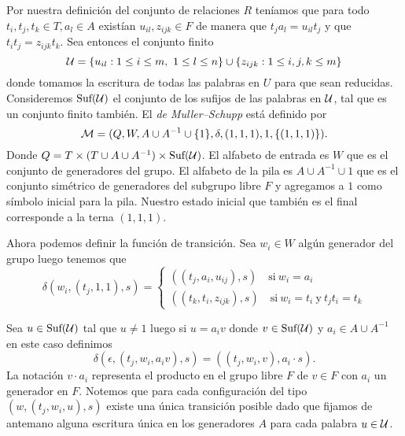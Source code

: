 \documentclass[tesis.tex]{subfiles}
\begin{document}
	Por nuestra definición del conjunto de relaciones $R$ teníamos que para todo $t_{i}, t_{j}, t_{k} \in T, a_{l} \in A$ existían $u_{il}, z_{ijk} \in F$ de manera que 
	$t_j a_l = u_{il} t_j $ y que $ t_it_j = z_{ijk}t_k $. 
	Sea entonces el conjunto finito 
	\[
	{\cal U} =  \{u_{il} : 1 \le i \le m, \ 1 \le l \le n \}  \cup  \{z_{ijk} : 1 \le i,j,k \le m\} 
	\]
	donde tomamos la escritura de todas las palabras en $U$ para que sean reducidas.
	Consideremos 
	$\text{Suf}({\cal U})$
	el conjunto de los sufijos de las palabras en $\cal U$, tal que es un conjunto finito también.
	El \emph{\APD de Muller--Schupp } está definido por 
	\[
	{\cal M }= (Q, W , A \cup A^{-1} \cup \{ 1 \}, \delta, (1,1,1), 1 ,\{(1,1,1)\}).
	\]
	Donde $Q = T \times (T \cup A \cup A^{-1}) \times \text{Suf}(\cal U)$.
	El alfabeto de entrada es $W$ que es el conjunto de generadores del grupo.
	El alfabeto de la pila es $A \cup A^{-1} \cup 1$ que es el conjunto simétrico de generadores del subgrupo libre $F$ y agregamos a $1$ como símbolo inicial para la pila.
	Nuestro estado inicial que también es el final corresponde a la terna $(1,1,1)$.

	Ahora podemos definir la función de transición. 
	Sea $w_i \in W$ algún generador del grupo luego tenemos que
	\[
	\delta(w_i,(t_j,1,1), s) =
	\begin{cases}
		((t_j,a_i,u_{ij}), s) \quad \text{si} \ w_{i}=a_{i} \\
		((t_k,t_i,z_{ijk}), s) \quad \text{si} \ w_{i}=t_{i} \ \text{y} \ t_{j}t_{i} = t_{k}
	\end{cases}\]

	Sea $u \in \text{Suf}({\cal U})$ tal que $u \neq 1$ luego si $u = a_{i}v $ donde $v \in \text{Suf}(\cal U)$ y $a_{i} \in A \cup A^{-1}$ 
	en este caso definimos 
	\begin{equation*}
		\delta(\epsilon,(t_j,w_i,a_{i}v), s) = ((t_j,w_i,v), a_{i} \cdot s).
	\end{equation*}
	La notación $v \cdot a_{i}$ representa el producto en el grupo libre $F$ de $v \in F$ con $a_{i}$ un generador en $F$.
	Notemos que para cada configuración del tipo $(w,(t_{j}, w_{i}, u),s)$ existe una única transición posible dado que fijamos de antemano alguna escritura única en los generadores $A$ para cada palabra $u \in \cal U$.
	
\end{document}
